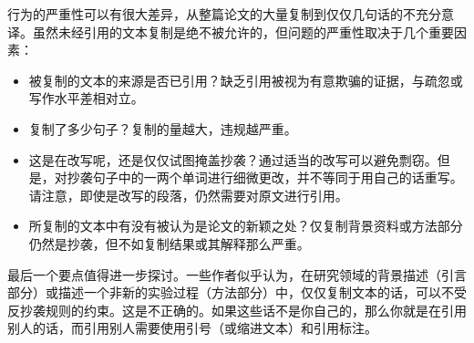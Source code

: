行为的严重性可以有很大差异，从整篇论文的大量复制到仅仅几句话的不充分意译。虽然未经引用的文本复制是绝不被允许的，但问题的严重性取决于几个重要因素：

\begin{itemize}
\item 被复制的文本的来源是否已引用？缺乏引用被视为有意欺骗的证据，与疏忽或写作水平差相对立。
\item 复制了多少句子？复制的量越大，违规越严重。
\item 这是在改写呢，还是仅仅试图掩盖抄袭？通过适当的改写可以避免剽窃。但是，对抄袭句子中的一两个单词进行细微更改，并不等同于用自己的话重写。请注意，即使是改写的段落，仍然需要对原文进行引用。
\item 所复制的文本中有没有被认为是论文的新颖之处？仅复制背景资料或方法部分仍然是抄袭，但不如复制结果或其解释那么严重。
\end{itemize}

最后一个要点值得进一步探讨。一些作者似乎认为，在研究领域的背景描述（引言部分）或描述一个非新的实验过程（方法部分）中，仅仅复制文本的话，可以不受反抄袭规则的约束。这是不正确的。如果这些话不是你自己的，那么你就是在引用别人的话，而引用别人需要使用引号（或缩进文本）和引用标注。

